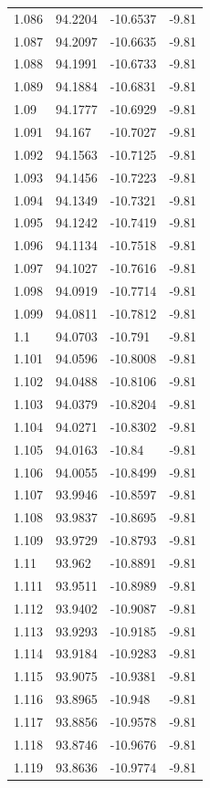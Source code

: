\begin{tabular}{llll}
1.086 & 94.2204 & -10.6537 & -9.81 \\
1.087 & 94.2097 & -10.6635 & -9.81 \\
1.088 & 94.1991 & -10.6733 & -9.81 \\
1.089 & 94.1884 & -10.6831 & -9.81 \\
1.09 & 94.1777 & -10.6929 & -9.81 \\
1.091 & 94.167 & -10.7027 & -9.81 \\
1.092 & 94.1563 & -10.7125 & -9.81 \\
1.093 & 94.1456 & -10.7223 & -9.81 \\
1.094 & 94.1349 & -10.7321 & -9.81 \\
1.095 & 94.1242 & -10.7419 & -9.81 \\
1.096 & 94.1134 & -10.7518 & -9.81 \\
1.097 & 94.1027 & -10.7616 & -9.81 \\
1.098 & 94.0919 & -10.7714 & -9.81 \\
1.099 & 94.0811 & -10.7812 & -9.81 \\
1.1 & 94.0703 & -10.791 & -9.81 \\
1.101 & 94.0596 & -10.8008 & -9.81 \\
1.102 & 94.0488 & -10.8106 & -9.81 \\
1.103 & 94.0379 & -10.8204 & -9.81 \\
1.104 & 94.0271 & -10.8302 & -9.81 \\
1.105 & 94.0163 & -10.84 & -9.81 \\
1.106 & 94.0055 & -10.8499 & -9.81 \\
1.107 & 93.9946 & -10.8597 & -9.81 \\
1.108 & 93.9837 & -10.8695 & -9.81 \\
1.109 & 93.9729 & -10.8793 & -9.81 \\
1.11 & 93.962 & -10.8891 & -9.81 \\
1.111 & 93.9511 & -10.8989 & -9.81 \\
1.112 & 93.9402 & -10.9087 & -9.81 \\
1.113 & 93.9293 & -10.9185 & -9.81 \\
1.114 & 93.9184 & -10.9283 & -9.81 \\
1.115 & 93.9075 & -10.9381 & -9.81 \\
1.116 & 93.8965 & -10.948 & -9.81 \\
1.117 & 93.8856 & -10.9578 & -9.81 \\
1.118 & 93.8746 & -10.9676 & -9.81 \\
1.119 & 93.8636 & -10.9774 & -9.81 \\

\end{tabular}
